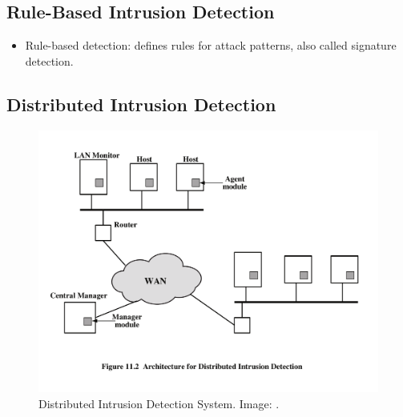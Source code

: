 \documentclass{beamer}
\begin{document}
\subsection{Rule-Based Intrusion Detection}

\begin{frame}{\insertsubsectionhead}
  \begin{itemize}
    \item Rule-based detection: defines rules for attack patterns, also called 
      signature detection.
  \end{itemize}
\end{frame}

%

\subsection{Distributed Intrusion Detection}

\begin{frame}{\insertsubsectionhead}
  \begin{figure}
    \includegraphics[height=0.7\textheight]{dids.pdf}
    \caption{Distributed Intrusion Detection System.
      Image: \cite{Stallings2013nse}.}
  \end{figure}
\end{frame}
\end{document}
